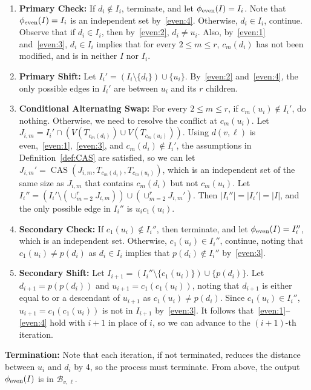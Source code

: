 \documentclass[11pt]{article}
\theoremstyle{definition}
\DeclareMathOperator{\cas}{CAS}
\begin{document}
\begin{enumerate}
    \item\textbf{Primary Check:} If $d_i\not\in I_i$, terminate, and let $\phi_{\textup{even}}(I)=I_i$. Note that $\phi_{\textup{even}}(I)=I_i$ is an independent set by~\ref{even:4}. Otherwise, $d_i\in I_i$, continue. Observe that if $d_i\in I_i$, then by~\ref{even:2}, $d_i\not=u_i$. Also, by~\ref{even:1} and~\ref{even:3}, $d_i\in I_i$ implies that for every $2\leq m\leq r$, $c_m(d_i)$ has not been modified, and is in neither $I$ nor $I_i$.
    \item\textbf{Primary Shift:} Let $I_i'=(I_i\setminus\{d_i\})\cup\{u_i\}$. By~\ref{even:2} and~\ref{even:4}, the only possible edges in $I_i'$ are between $u_i$ and its $r$ children. 
    \item\textbf{Conditional Alternating Swap:} For every $2\leq m\leq r$, if $c_m(u_i)\not\in I_i'$, do nothing. Otherwise, we need to resolve the conflict at $c_m(u_i)$. Let $J_{i,m}=I_i'\cap(V(T_{c_m(d_i)})\cup V(T_{c_m(u_i)}))$. Using $d(v,\ell)$ is even,~\ref{even:1},~\ref{even:3}, and $c_m(d_i)\not\in I_i'$, the assumptions in Definition~\ref{def:CAS} are satisfied, so we can let $J_{i,m}'=\cas(J_{i,m},T_{c_m(d_i)},T_{c_m(u_i)})$, which is an independent set of the same size as $J_{i,m}$ that contains $c_m(d_i)$ but not $c_m(u_i)$. Let $I_i''=(I_i'\setminus(\cup_{m=2}^rJ_{i,m}))\cup(\cup_{m=2}^rJ_{i,m}')$. Then $|I_i''|=|I_i'|=|I|$, and the only possible edge in $I_i''$ is $u_ic_1(u_i)$.
    \item\textbf{Secondary Check:} If $c_1(u_i)\not\in I_i''$, then terminate, and let $\phi_{\textup{even}}(I)=I_i''$, which is an independent set. Otherwise, $c_1(u_i)\in I_i''$, continue, noting that $c_1(u_i)\not=p(d_i)$ as $d_i\in I_i$ implies that $p(d_i)\not\in I_i''$ by~\ref{even:3}.
    \item\textbf{Secondary Shift:} Let $I_{i+1}=(I_i''\setminus\{c_1(u_i)\})\cup\{p(d_i)\}$. Let $d_{i+1}=p(p(d_i))$ and $u_{i+1}=c_1(c_1(u_i))$, noting that $d_{i+1}$ is either equal to or a descendant of $u_{i+1}$ as $c_1(u_i)\not=p(d_i)$. Since $c_1(u_i)\in I_i''$, $u_{i+1}=c_1(c_1(u_i))$ is not in $I_{i+1}$ by~\ref{even:3}. It follows that~\ref{even:1}--\ref{even:4} hold with $i+1$ in place of $i$, so we can advance to the $(i+1)$-th iteration.
\end{enumerate}

\noindent\textbf{Termination:} Note that each iteration, if not terminated, reduces the distance between $u_i$ and $d_i$ by 4, so the process must terminate. From above, the output $\phi_{\textup{even}}(I)$ is in $\mathcal{B}_{v,\ell}$. 
\end{document}
